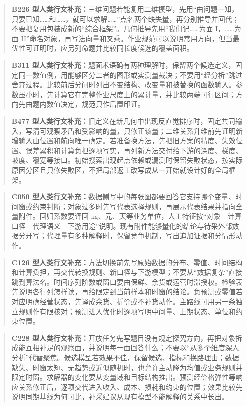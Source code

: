 \documentclass[withoutpreface,bwprint]{cumcmthesis}
\newif\ifmcmguidance
\begin{document}
\ifmcmguidance
  \begin{quote}\small
  \textbf{B226 型人类行文补充：}三维问题若能复用二维模型，先用“由问题一知，只要已知……和……，就可以求解……”点名两个缺失量，再分别推导并回代；不要把复用包装成新的“综合框架”。几何推导先用“我们记……为面 I，……为面 II”命名对象，再写法向量和叉乘。作业规范可以说明常用方向，但当最优性可证明时，应另列命题并比较同长度候选的覆盖面积。
  \end{quote}
  \begin{quote}\small
  \textbf{B311 型人类行文补充：}题面术语确有两种理解时，保留两个候选定义，固定同一数值例，用能够区分二者的图形或实测量裁决；不要用“经分析”跳过舍弃过程。比较前后分问时列出不变结构、改变量和被替换的函数输入。参数虽小时，先计算它在完整作业尺度上的累计量，并比较两端可行区间；方向先由题内数值决定，规范只作后置印证。
  \end{quote}
  \begin{quote}\small
  \textbf{B477 型人类行文补充：}旧定义在新几何中出现反直觉排序时，固定共同输入，写清可观察矛盾和受影响的量，只修正该量；二维关系升维前先证明新增输入由位置和航向唯一确定。若准备换方法，先把旧方案的精度、失效位置、误差累积和计算负担逐项写实，再列新方法交付给下游的深度、梯度、坡度、覆宽等接口。初始搜索出现起点依赖或漏测时保留失败状态，按实际原因分区且只修失败区，不把局部返工改写成从一开始就设计好的全局框架。
  \end{quote}
  \begin{quote}\small
  \textbf{C050 型人类行文补充：}数据侧写中的每张图都要回答它支持哪个变量、时间窗或约束判断；对象过多时先写代表选择规则，再展示代表结果并指向全量附件。回归系数要译回 kg、元、天等业务单位，人工特征按“对象—计算口径—代理语义—下游用途”说明。现有附件能够量化的结论与待采外部数据分开写；代理量有多种解释时，保留竞争机制，写出追加证据和分情形动作。
  \end{quote}
  \begin{quote}\small
  \textbf{C126 型人类行文补充：}方法切换前先写原始数据的分布、零值、时间结构和计算负担，再交代转换规则、新口径与下游模型；不要从“数据复杂”直接跳到算法名。时间序列阶数或窗口要由保鲜、余货或运营时滞授权。检验表先说明各行列怎样读，再给限定到当前样本和时窗的结论。负预测或零值若对应明确经营状态，先译成余货、折价或不补货动作。主路线可用另一条独立规则作有限核对；预测进入优化时逐项写明中间量、上期状态、单位和约束位置。
  \end{quote}
  \begin{quote}\small
  \textbf{C228 型人类行文补充：}开放任务先写题目没有规定探究方向，再把对象拆成能互相补足的观察面，并说明每一面回答什么；不要以“从多个维度深入分析”代替聚焦。候选模型若效果不佳，保留候选、指标和换路理由；数据缺失、时窗太短、无趋势或近似随机时，也允许主动降为均值或业务规则并限定时窗。求解器的变化要从变量域和目标结构推出。预测经价格弹性等响应关系修正后，逐项交代进入收入、成本、损耗和约束的位置；效果比较先说明同期基线为何可比，补采建议从现有模型不能解释的关系中长出。
  \end{quote}
\end{document}
